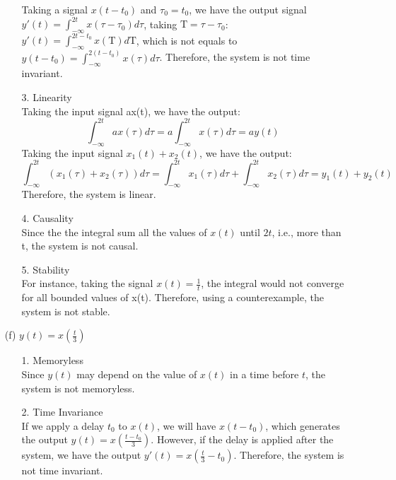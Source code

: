 \documentclass{article}
\begin{document}
\begin{enumerate}
\begin{enumerate}
                Taking a signal $x(t-t_{0})$ and $\tau_{0}=t_{0}$, we have the output signal $y'(t) = \int_{-\infty}^{2t} x(\tau-\tau_{0})d\tau$, taking $\mathrm{T} = \tau-\tau_{0}$: $y'(t) = \int_{-\infty}^{2t-t_{0}} x(\mathrm{T})d\mathrm{T}$, which is not equals to $y(t-t_{0}) = \int_{-\infty}^{2(t-t_{0})} x(\tau)d\tau$. Therefore, the system is not time invariant.
                \item[3.] Linearity \\ 
                Taking the input signal ax(t), we have the output:
                \begin{equation*}
                \int_{-\infty}^{2t} ax(\tau)d\tau = a\int_{-\infty}^{2t} x(\tau)d\tau = ay(t)
                \end{equation*}
                Taking the input signal $x_{1}(t)+x_{2}(t)$, we have the output:
                \begin{equation*}
                    \int_{-\infty}^{2t} (x_{1}(\tau)+x_{2}(\tau))d\tau = \int_{-\infty}^{2t} x_{1}(\tau)d\tau + \int_{-\infty}^{2t} x_{2}(\tau)d\tau = y_{1}(t)+y_{2}(t)
                \end{equation*}
                Therefore, the system is linear.
                \item[4.] Causality \\
                Since the the integral sum all the values of $x(t)$ until $2t$, i.e., more than t, the system is not causal.
                \item[5.] Stability \\
                For instance, taking the signal $x(t) = \frac{1}{t}$, the integral would not converge for all bounded values of x(t). Therefore, using a counterexample, the system is not stable.
        \end{enumerate}
    \item[(f)] $y(t) = x(\frac{t}{3}) $
        \begin{enumerate}
            \item[1.] Memoryless \\
                Since $y(t)$ may depend on the value of $x(t)$ in a time before $t$, the system is not memoryless.
            \item[2.] Time Invariance \\
                If we apply a delay $t_{0}$ to $x(t)$, we will have $x(t-t_{0})$, which generates the output $y(t) = x(\frac{t-t_{0}}{3})$. However, if the delay is applied after the system, we have the output $y'(t) = x(\frac{t}{3}-t_{0})$. Therefore, the system is not time invariant.

\end{enumerate}
\end{enumerate}
\end{document}

